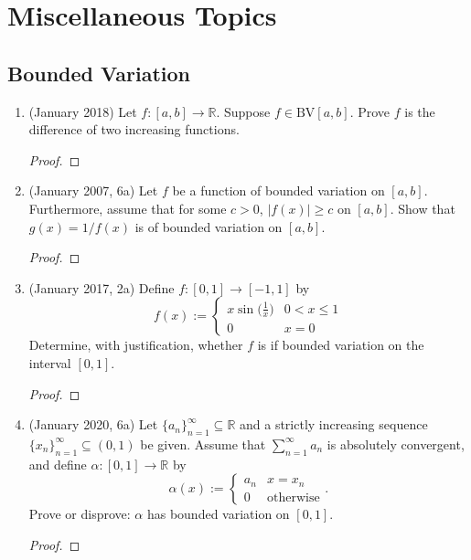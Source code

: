 \documentclass[reqno]{article}
\theoremstyle{remark}
\numberwithin{equation}{section}
\newcommand{\R}{\mathbb{R}}
\begin{document}
\section{Miscellaneous Topics}
\subsection*{Bounded Variation}
\begin{enumerate}

    \item (January 2018) Let $f \colon [a,b] \to \R$. Suppose $f \in \text{BV}[a,b]$. Prove $f$ is the difference of two increasing functions.
    
    	\begin{proof}
    
    \end{proof}

    
	\item (January 2007, 6a) Let $f$ be a function of bounded variation on $[a,b]$. Furthermore, assume that for some $c>0$, $|f(x)| \geq c$ on $[a,b]$. Show that $g(x) = 1/f(x)$ is of bounded variation on $[a,b]$.
	
		\begin{proof}
    
    \end{proof}
	
	\item (January 2017, 2a) Define $f \colon [0,1] \to [-1,1]$ by 
	$$
	f(x):= \begin{cases} x\sin\big({\frac{1}{x}}\big) & 0 < x \leq 1 \\ 0 & x = 0 \end{cases}
	$$
	Determine, with justification, whether $f$ is if bounded variation on the interval $[0,1]$. 
	
		\begin{proof}
    
    \end{proof}
	
	\item (January 2020, 6a) Let $\{a_n\}_{n=1}^\infty \subseteq \R$ and a strictly increasing sequence $\{x_n\}_{n=1}^\infty \subseteq (0,1)$ be given. Assume that $\sum_{n=1}^\infty a_n$ is absolutely convergent, and define $\alpha \colon [0,1] \to \R$ by 
	$$
	\alpha(x):= \begin{cases} a_n &  x=x_n \\ 0 & \text{otherwise} \end{cases}.
	$$
    Prove or disprove: $\alpha$ has bounded variation on $[0,1]$. 
    
    	\begin{proof}
    
    \end{proof}
\end{enumerate}
\end{document}
